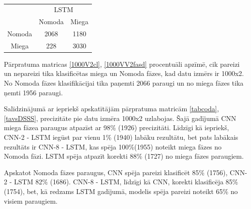 \documentclass[12pt,paper=A4]{report}
\begin{document}
\begin{table}[H]
\centering
\caption{}
\captionsetup{justification=centering}
\begin{tabular}{lcc}
 & \multicolumn{2}{c}{LSTM} \\ \cline{2-3} 
\multicolumn{1}{l|}{} & \multicolumn{1}{c|}{Nomoda} & \multicolumn{1}{c|}{Miega} \\ \hline
\multicolumn{1}{|c|}{Nomoda} & \multicolumn{1}{c|}{\cellcolor[HTML]{FFFFC7}2068} & \multicolumn{1}{c|}{1180} \\ \hline
\multicolumn{1}{|c|}{Miega} & \multicolumn{1}{c|}{228} & \multicolumn{1}{c|}{\cellcolor[HTML]{FFFFC7}3030} \\ \hline
\end{tabular}
\label{tarv}
\end{table}


Pārpratuma matricas \ref{1000V2cl}, \ref{1000VV2fasd} procentuāli apzīmē, cik pareizi un nepareizi tika klasificētas miega un Nomoda fāzes, kad datu izmērs ir 1000x2. No Nomoda fāzes klasifikācijai tika paņemti 2066 paraugi un no miega fāzes tika ņemti 1956 paraugi.

Salīdzinājumā ar iepriekš apskatītājām pārpratuma matricām \ref{tabcoda}, \ref{tavsDSSS}, precizitāte pie datu izmēra 1000x2 uzlabojas. Šajā gadījumā CNN miega fāzea paraugus atpazīst ar 98\% (1926) precizitāti. Līdzīgi kā iepriekš, CNN-2 - LSTM iegūst par vienu 1\% (1940) labāku rezultātu, bet pats labākais rezultāts ir CNN-8 - LSTM, kas spēja 100\%(1955) noteikt miega fāzes no Nomoda fāzi. LSTM spēja atpazīt korekti 88\% (1727) no miega fāzes paraugiem. 

Apskatot Nomoda fāzes paraugus, CNN spēja pareizi klasificēt 85\% (1756), CNN-2 - LSTM 82\% (1686). CNN-8 - LSTM, līdzīgi kā CNN, korekti klasificēja 85\% (1754), bet, kā redzams LSTM gadījumā, modelis spēja pareizi noteikt 65\% no visiem paraugiem.
\end{document}
